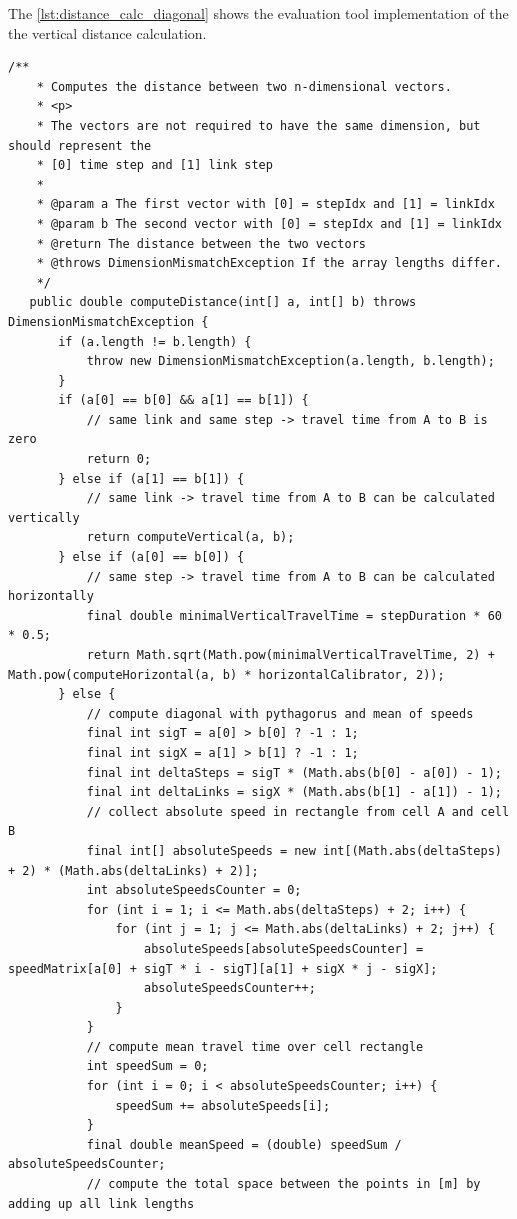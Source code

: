 The \cref{lst:distance_calc_diagonal} shows the evaluation tool implementation of the the vertical distance calculation.
\begin{lstlisting}[basicstyle=\tiny, style=java, caption={Implementation of \textit{diagonal distance calculation}}, label=lst:distance_calc_diagonal] 
	/**
	* Computes the distance between two n-dimensional vectors.
	* <p>
	* The vectors are not required to have the same dimension, but should represent the
	* [0] time step and [1] link step
	*
	* @param a The first vector with [0] = stepIdx and [1] = linkIdx
	* @param b The second vector with [0] = stepIdx and [1] = linkIdx
	* @return The distance between the two vectors
	* @throws DimensionMismatchException If the array lengths differ.
	*/
   public double computeDistance(int[] a, int[] b) throws DimensionMismatchException {
	   if (a.length != b.length) {
		   throw new DimensionMismatchException(a.length, b.length);
	   }
	   if (a[0] == b[0] && a[1] == b[1]) {
		   // same link and same step -> travel time from A to B is zero
		   return 0;
	   } else if (a[1] == b[1]) {
		   // same link -> travel time from A to B can be calculated vertically
		   return computeVertical(a, b);
	   } else if (a[0] == b[0]) {
		   // same step -> travel time from A to B can be calculated horizontally
		   final double minimalVerticalTravelTime = stepDuration * 60 * 0.5;
		   return Math.sqrt(Math.pow(minimalVerticalTravelTime, 2) + Math.pow(computeHorizontal(a, b) * horizontalCalibrator, 2));
	   } else {
		   // compute diagonal with pythagorus and mean of speeds
		   final int sigT = a[0] > b[0] ? -1 : 1;
		   final int sigX = a[1] > b[1] ? -1 : 1;
		   final int deltaSteps = sigT * (Math.abs(b[0] - a[0]) - 1);
		   final int deltaLinks = sigX * (Math.abs(b[1] - a[1]) - 1);
		   // collect absolute speed in rectangle from cell A and cell B
		   final int[] absoluteSpeeds = new int[(Math.abs(deltaSteps) + 2) * (Math.abs(deltaLinks) + 2)];
		   int absoluteSpeedsCounter = 0;
		   for (int i = 1; i <= Math.abs(deltaSteps) + 2; i++) {
			   for (int j = 1; j <= Math.abs(deltaLinks) + 2; j++) {
				   absoluteSpeeds[absoluteSpeedsCounter] = speedMatrix[a[0] + sigT * i - sigT][a[1] + sigX * j - sigX];
				   absoluteSpeedsCounter++;
			   }
		   }
		   // compute mean travel time over cell rectangle
		   int speedSum = 0;
		   for (int i = 0; i < absoluteSpeedsCounter; i++) {
			   speedSum += absoluteSpeeds[i];
		   }
		   final double meanSpeed = (double) speedSum / absoluteSpeedsCounter;
		   // compute the total space between the points in [m] by adding up all link lengths

\end{lstlisting}
